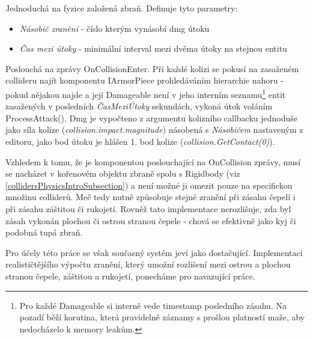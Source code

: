 Jednoduchá na fyzice založená zbraň. Definuje tyto parametry:
\begin{itemize}
  \item \textit{Násobič zranění} - číslo kterým vynásobí dmg útoku 
  \item \textit{Čas mezi útoky} - minimální interval mezi dvěma útoky na stejnou entitu
\end{itemize}

Poslouchá na zprávy OnCollisionEnter. Při každé kolizi se pokusí na zasaženém collideru najít komponentu IArmorPiece prohledáváním hierarchie nahoru - pokud nějakou najde a její Damageable není v jeho interním seznamu\footnote{Pro každé Damageable si interně vede timestamp posledního zásahu. Na pozadí běží korutina, která pravidelně záznamy s prošlou platností maže, aby nedocházelo k memory leakům.} entit zasažených v posledních \textit{ČasMeziÚtoky} sekundách, vykoná útok voláním ProcessAttack(). Dmg je vypočteno z argumentu kolizního callbacku jednoduše jako síla kolize (\textit{collision.impact.magnitude}) násobená s \textit{Násobičem} nastaveným z editoru, jako bod útoku je hlášen 1. bod kolize (\textit{collision.GetContact(0)}). 

Vzhledem k tomu, že je komponentou poslouchající na OnCollision zprávy, musí se nacházet v kořenovém objektu zbraně spolu s Rigidbody (viz \ref{collidersPhysicsIntroSubsection}) a není možné ji omezit pouze na specifickou množinu colliderů. Meč tedy nutně způsobuje stejné zranění při zásahu čepelí i při zásahu záštitou či rukojetí. Rovněž tato implementace nerozlišuje, zda byl zásah vykonán plochou či ostrou stranou čepele - chová se efektivně jako kyj či podobná tupá zbraň. 

Pro účely této práce se však současný systém jeví jako dostačující. Implementaci realističtějšího výpočtu zranění, který umožní rozlišení mezi ostrou a plochou stranou čepele, záštitou a rukojetí, ponecháme pro navazující práce. 

\pagebreak


